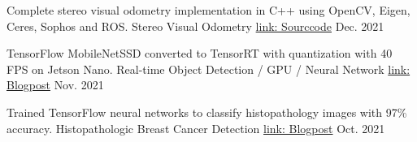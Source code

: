 

\begin{cventries}

    \course
    {Complete stereo visual odometry implementation in C++ using OpenCV, Eigen, Ceres, Sophos and ROS.
    } %
    {Stereo Visual Odometry} %
    {
        \href{https://github.com/apresland/visual-slam}{\color{awesome-red}link: Sourccode}
    } %
    {Dec. 2021} %
    {}

    \course
    {TensorFlow MobileNetSSD converted to TensorRT with quantization with 40 FPS on Jetson Nano.} %
    {Real-time Object Detection / GPU / Neural Network} %
    {
        \href{https://presland.io/deeplearning/2021/11/16/jetson-nano-object-detection.html}{\color{awesome-red}link: Blogpost}      
    } %
    {Nov. 2021} %
    {}

    \course
    {Trained TensorFlow neural networks to classify histopathology images with 97\% accuracy.} %
    {Histopathologic Breast Cancer Detection} %
    {
        \href{https://presland.io/medicalimaging/2021/10/11/medical-imaging-cnn.html}{\color{awesome-red}link: Blogpost} 
    }%
    {Oct. 2021} %
    {}

\end{cventries}
